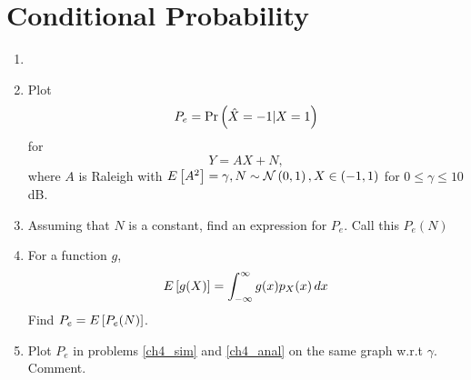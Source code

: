 \documentclass[journal,12pt,twocolumn]{IEEEtran}
\renewcommand\thesection{\arabic{section}}
\begin{document}
\section{Conditional Probability}
\begin{enumerate}[label=\thesection.\arabic*
,ref=\thesection.\theenumi]
\item
\item
\label{ch4_sim}
Plot 
\begin{equation}
P_e = \Pr\left(\hat{X} = -1|X=1\right)
\end{equation}
%
for 
\begin{equation}
Y = AX+N,
\end{equation}
where $A$ is Raleigh with $E\left[ A^2 \right] = \gamma, N \sim \mathcal{N}\left(0,1\right), X \in \left(-1,1\right)$ for $0 \le \gamma \le 10$ dB.
%
\item
Assuming that $N$ is a constant, find an expression for $P_e$.  Call this $P_e(N)$
%
\item
%
\label{ch4_anal}
For a function $g$,
\begin{equation}
E\left[ g(X) \right] = \int_{-\infty}^{\infty}g(x)p_{X}(x)\, dx
\end{equation}
%
Find $P_e = E\left[ P_e(N) \right]$.
%
\item
Plot $P_e$ in problems \ref{ch4_sim} and \ref{ch4_anal} on the same graph w.r.t $\gamma$.  Comment.
		\end{enumerate}
\end{document}
